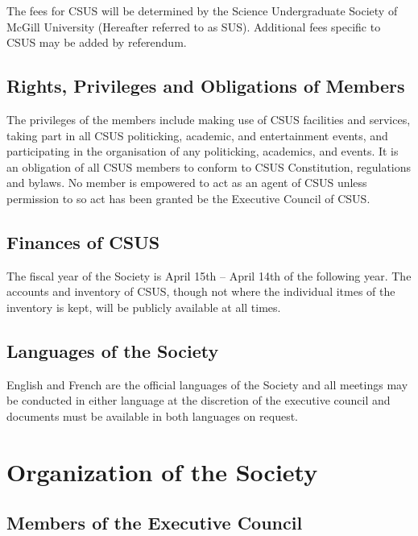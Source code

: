 The fees for CSUS will be determined by the Science Undergraduate
Society of McGill University (Hereafter referred to as SUS). Additional
fees specific to CSUS may be added by referendum.

\subsection{Rights, Privileges and Obligations of
Members}\label{rights-privileges-and-obligations-of-members}

The privileges of the members include making use of CSUS facilities and
services, taking part in all CSUS politicking, academic, and
entertainment events, and participating in the organisation of any
politicking, academics, and events. It is an obligation of all CSUS
members to conform to CSUS Constitution, regulations and bylaws. No
member is empowered to act as an agent of CSUS unless permission to so
act has been granted be the Executive Council of CSUS.

\subsection{Finances of CSUS}\label{finances-of-csus}

The fiscal year of the Society is April 15th -- April 14th of the
following year. The accounts and inventory of CSUS, though not where the
individual itmes of the inventory is kept, will be publicly available at
all times.

\subsection{Languages of the Society}\label{languages-of-the-society}

English and French are the official languages of the Society and all
meetings may be conducted in either language at the discretion of the
executive council and documents must be available in both languages on
request.

\section{Organization of the Society}\label{organization-of-the-society}

\subsection{Members of the Executive
Council}\label{members-of-the-executive-council}

